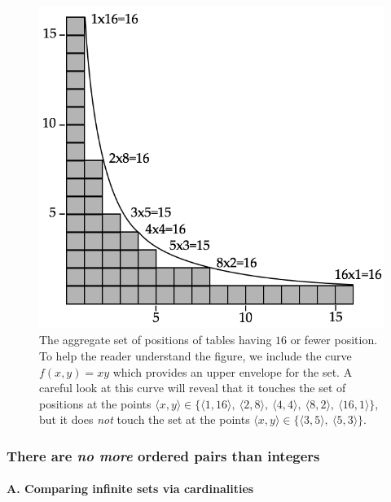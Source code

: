 \begin{figure}[htb]
\begin{center}
       \includegraphics[scale=0.4]{FiguresArithmetic/PairingHyp}
\caption{The aggregate set of positions of tables having $16$ or
    fewer position.  To help the reader understand the figure, we
    include the curve $f(x,y) = xy$ which provides an upper envelope
    for the set.  A careful look at this curve will reveal that it
    touches the set of positions at the points $\langle x,y \rangle
    \in \{ \langle 1,16 \rangle, \ \langle 2,8 \rangle, \ \langle 4,4
    \rangle, \ \langle 8,2 \rangle, \ \langle 16,1 \rangle \}$, but it
    does {\em not} touch the set at the points $\langle x,y \rangle
    \in \{ \langle 3,5 \rangle, \ \langle 5,3 \rangle \}$. 
\label{f.hyp}}
\end{center}
\end{figure}

\subsubsection{There are {\em no more} ordered pairs than integers}
\label{sec:cardinality-NxN}

\paragraph{\small\sf A. Comparing infinite sets via cardinalities}

